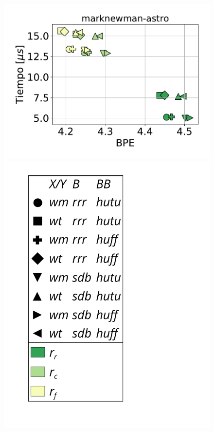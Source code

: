 \begin{figure}
    	\centering
    	\begin{minipage}{1\textwidth}
    		\centering
    		\begin{minipage}{0.45\textwidth}
    			\centering
    			\begin{minipage}{0.75\textwidth}
    				\centering
    				\includegraphics[width=1\linewidth]{img/sdsl/aleatorio/marknewman-astro.pdf}
    			\end{minipage}
    			\begin{minipage}{0.2\textwidth}
    				\centering
    				\includegraphics[scale=.16, clip, trim=70 0 0 0]{img/sdsl/label.pdf}
    			\end{minipage}
    			

\end{minipage}
\end{minipage}
\end{figure}
